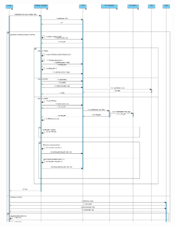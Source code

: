 \documentclass[11pt]{article}
\begin{document}
\begin{figure}[!h]
\vspace*{-4cm}

\centering
	\begin{subfigure}{600px}
	\hspace*{-4.3cm}
	\includegraphics[width=600px, height=789px]{SQD_IORead.png}\\
	\end{subfigure}
\end{figure}
\clearpage
\end{document}
